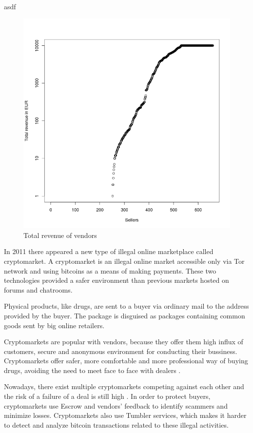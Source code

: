\documentclass[
  digital, %
  table,   %
  lof,     %
  lot,     %
  oneside
]{fithesis3}
\begin{document}
asdf
\begin{figure}[!htb]
    \centering
    \includegraphics[scale=0.4]{total-rev}
    \caption{Total revenue of vendors}
    \label{Vendors by total revenue}
\end{figure}

In 2011 there appeared a new type of illegal online marketplace called cryptomarket. 
A cryptomarket is an illegal online market accessible only via Tor network and using bitcoins
as a means of making payments. These two technologies provided a safer environment
than previous markets hosted on forums and chatrooms.

Physical products, like drugs, are sent to a buyer via ordinary mail to the address provided by the buyer.
The package is disguised as packages containing common goods sent by big online retailers.
\parencite{paquet2017cryptomarkets}

Cryptomarkets are popular with vendors,
because they offer them high influx of customers, secure and anonymous environment for conducting their bussiness\parencite {van2014responsible}.
Cryptomarkets offer safer, more comfortable and more professional way of buying drugs, avoiding 
the need to meet face to face with dealers \parencite{barratt2014use}.

Nowadays, there exist multiple cryptomarkets competing against each other and the risk
of a failure of a deal is still high \parencite{wehinger2011dark}.
In order to protect buyers, cryptomarkets use Escrow and vendors' feedback to identify scammers and minimize losses.
Cryptomarkets also use Tumbler services, which makes it harder to detect and analyze bitcoin transactions
 related to these illegal activities.
\end{document}
